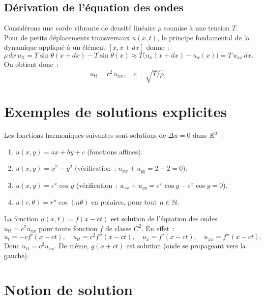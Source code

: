 \subsection{D\'erivation de l'\'equation des ondes}

Consid\'erons une corde vibrante de densit\'e lin\'eaire $\rho$ soumise
\`a une tension $T$. Pour de petits d\'eplacements transversaux $u(x,t)$,
le principe fondamental de la dynamique appliqu\'e \`a un \'el\'ement
$[x, x+dx]$ donne~:
\[
    \rho\, dx\, u_{tt} = T\sin\theta(x+dx) - T\sin\theta(x)
    \approx T\bigl(u_x(x+dx) - u_x(x)\bigr) = T\, u_{xx}\, dx.
\]
On obtient donc~:
\begin{equation}\label{eq:ondes_derivation}
    u_{tt} = c^2\, u_{xx}, \quad c = \sqrt{T/\rho}.
\end{equation}

\section{Exemples de solutions explicites}

\begin{exemple}
Les fonctions harmoniques suivantes sont solutions de $\Delta u = 0$
dans $\mathbb{R}^2$~:
\begin{enumerate}
    \item $u(x,y) = ax + by + c$ (fonctions affines).
    \item $u(x,y) = x^2 - y^2$ (v\'erification~: $u_{xx} + u_{yy} = 2 - 2 = 0$).
    \item $u(x,y) = e^x \cos y$ (v\'erification~: $u_{xx} + u_{yy} = e^x\cos y - e^x\cos y = 0$).
    \item $u(r,\theta) = r^n \cos(n\theta)$ en polaires, pour tout $n \in \mathbb{N}$.
\end{enumerate}
\end{exemple}

\begin{exemple}
La fonction $u(x,t) = f(x - ct)$ est solution de l'\'equation des ondes
$u_{tt} = c^2 u_{xx}$ pour toute fonction $f$ de classe $C^2$. En effet~:
\[
    u_t = -c f'(x-ct), \quad u_{tt} = c^2 f''(x-ct), \quad
    u_x = f'(x-ct), \quad u_{xx} = f''(x-ct).
\]
Donc $u_{tt} = c^2 u_{xx}$. De m\^eme, $g(x+ct)$ est solution (onde se
propageant vers la gauche).
\end{exemple}

\section{Notion de solution}

